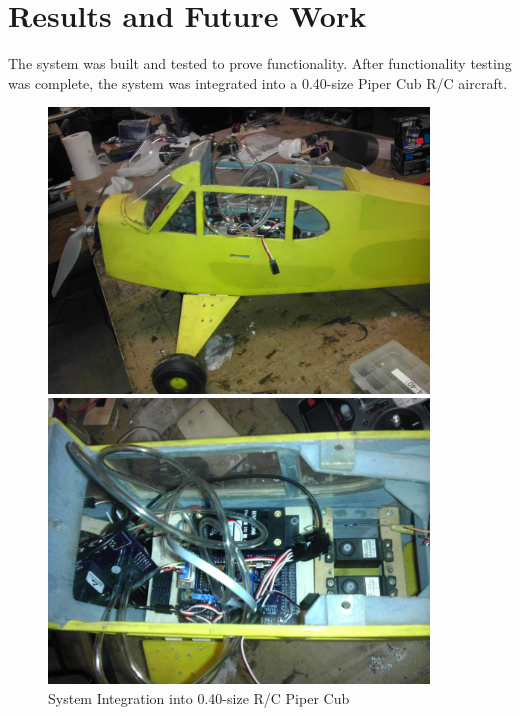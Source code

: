 \section{Results and Future Work}
\label{results}
The system was built and tested to prove functionality. After functionality testing was complete, the system was integrated into a 0.40-size Piper Cub R/C aircraft.

\begin{figure}[H]
\label{sysIntPics}
\begin{minipage}[b]{0.45\linewidth}
  \centering
    \includegraphics[width=0.9\textwidth]{figures/sysInt1.jpg}
\end{minipage}
\begin{minipage}[b]{0.45\linewidth}
  \centering
    \includegraphics[width=0.9\textwidth]{figures/sysInt2.jpg}
\end{minipage}
\caption{System Integration into 0.40-size R/C Piper Cub}
\end{figure}
